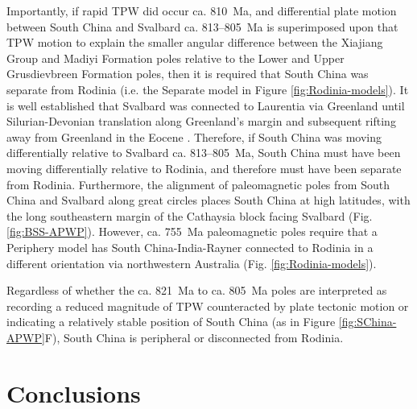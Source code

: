 Importantly, if rapid TPW did occur ca. 810~Ma, and differential plate motion between South China and Svalbard ca. 813--805~Ma is superimposed upon that TPW motion to explain the smaller angular difference between the Xiajiang Group and Madiyi Formation poles relative to the Lower and Upper Grusdievbreen Formation poles, then it is required that South China was separate from Rodinia (i.e. the Separate model in Figure \ref{fig:Rodinia-models}). It is well established that Svalbard was connected to Laurentia via Greenland until Silurian-Devonian translation along Greenland's margin and subsequent rifting away from Greenland in the Eocene \citep{Torsvik2016a}. Therefore, if South China was moving differentially relative to Svalbard ca. 813--805~Ma, South China must have been moving differentially relative to Rodinia, and therefore must have been separate from Rodinia. Furthermore, the alignment of paleomagnetic poles from South China and Svalbard along great circles places South China at high latitudes, with the long southeastern margin of the Cathaysia block facing Svalbard (Fig. \ref{fig:BSS-APWP}). However, ca. 755~Ma paleomagnetic poles require that a Periphery model has South China-India-Rayner connected to Rodinia in a different orientation via northwestern Australia (Fig. \ref{fig:Rodinia-models}).

Regardless of whether the ca. 821~Ma to ca. 805~Ma poles are interpreted as recording a reduced magnitude of TPW counteracted by plate tectonic motion or indicating a relatively stable position of South China (as in Figure \ref{fig:SChina-APWP}F), South China is peripheral or disconnected from Rodinia.

\section{Conclusions}

